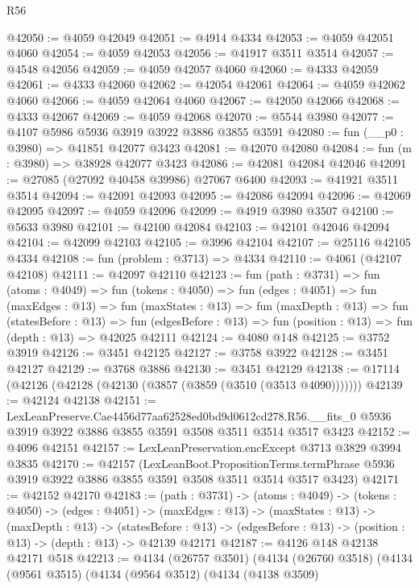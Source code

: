 \begin{lexlean}{R56}
\begin{coremodule}
@42050 := @4059 @42049
@42051 := @4914 @4334
@42053 := @4059 @42051 @4060
@42054 := @4059 @42053
@42056 := @41917 @3511 @3514
@42057 := @4548 @42056
@42059 := @4059 @42057 @4060
@42060 := @4333 @42059
@42061 := @4333 @42060
@42062 := @42054 @42061
@42064 := @4059 @42062 @4060
@42066 := @4059 @42064 @4060
@42067 := @42050 @42066
@42068 := @4333 @42067
@42069 := @4059 @42068
@42070 := @5544 @3980
@42077 := @4107 @5986 @5936 @3919 @3922 @3886 @3855 @3591
@42080 := fun (__p0 : @3980) => @41851 @42077 @3423
@42081 := @42070 @42080
@42084 := fun (m : @3980) => @38928 @42077 @3423
@42086 := @42081 @42084 @42046
@42091 := @27085 (@27092 @40458 @39986) @27067 @6400
@42093 := @41921 @3511 @3514
@42094 := @42091 @42093
@42095 := @42086 @42094
@42096 := @42069 @42095
@42097 := @4059 @42096
@42099 := @4919 @3980 @3507
@42100 := @5633 @3980
@42101 := @42100 @42084
@42103 := @42101 @42046 @42094
@42104 := @42099 @42103
@42105 := @3996 @42104
@42107 := @25116 @42105 @4334
@42108 := fun (problem : @3713) => @4334
@42110 := @4061 (@42107 @42108)
@42111 := @42097 @42110
@42123 := fun (path : @3731) =>
  fun (atoms : @4049) =>
  fun (tokens : @4050) =>
  fun (edges : @4051) =>
  fun (maxEdges : @13) =>
  fun (maxStates : @13) =>
  fun (maxDepth : @13) =>
  fun (statesBefore : @13) =>
  fun (edgesBefore : @13) => fun (position : @13) => fun (depth : @13) => @42025 @42111
@42124 := @4080 @148
@42125 := @3752 @3919
@42126 := @3451 @42125
@42127 := @3758 @3922
@42128 := @3451 @42127
@42129 := @3768 @3886
@42130 := @3451 @42129
@42138 := @17114 (@42126 (@42128 (@42130 (@3857 (@3859 (@3510 (@3513 @4090)))))))
@42139 := @42124 @42138
@42151 := LexLeanPreserve.Cae4456d77aa62528ed0bd9d0612cd278.R56.__fits_0
    @5936
    @3919
    @3922
    @3886
    @3855
    @3591
    @3508
    @3511
    @3514
    @3517
    @3423
@42152 := @4096 @42151
@42157 := LexLeanPreservation.encExcept @3713 @3829 @3994 @3835
@42170 := @42157
    (LexLeanBoot.PropositionTerms.termPhrase
      @5936
      @3919
      @3922
      @3886
      @3855
      @3591
      @3508
      @3511
      @3514
      @3517
      @3423)
@42171 := @42152 @42170
@42183 := (path : @3731) ->
  (atoms : @4049) ->
  (tokens : @4050) ->
  (edges : @4051) ->
  (maxEdges : @13) ->
  (maxStates : @13) ->
  (maxDepth : @13) ->
  (statesBefore : @13) -> (edgesBefore : @13) -> (position : @13) -> (depth : @13) -> @42139 @42171
@42187 := @4126 @148 @42138 @42171 @518
@42213 := @4134
    (@26757 @3501)
    (@4134
      (@26760 @3518)
      (@4134
        (@9561 @3515)
        (@4134
          (@9564 @3512)
          (@4134
            (@4138 @3509)

\end{coremodule}
\end{lexlean}
